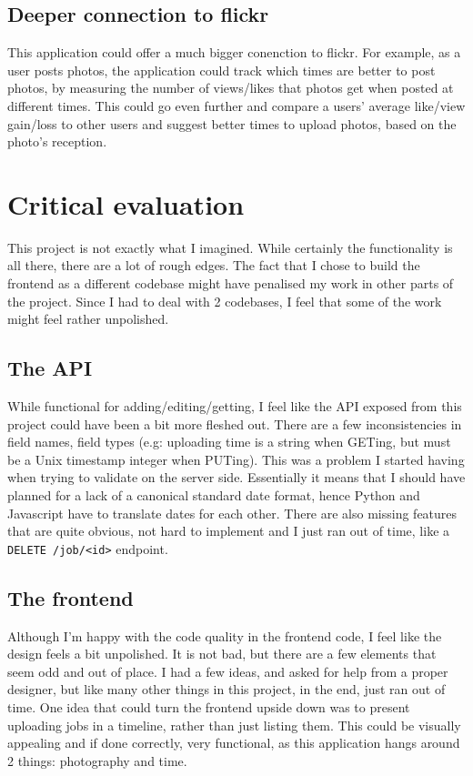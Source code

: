 \documentclass[10pt, a4paper]{article}
\begin{document}
        \subsection{Deeper connection to flickr}
        This application could offer a much bigger conenction to flickr. For example, as a user posts photos, the application could track which times are better to post photos, by measuring the number of views/likes that photos get when posted at different times. This could go even further and compare a users' average like/view gain/loss to other users and suggest better times to upload photos, based on the photo's reception.

        \section{Critical evaluation}
        This project is not exactly what I imagined. While certainly the functionality is all there, there are a lot of rough edges. The fact that I chose to build the frontend as a different codebase might have penalised my work in other parts of the project. Since I had to deal with 2 codebases, I feel that some of the work might feel rather unpolished.
        
        \subsection{The API}
        While functional for adding/editing/getting, I feel like the API exposed from this project could have been a bit more fleshed out. There are a few inconsistencies in field names, field types (e.g: uploading time is a string when GETing, but must be a Unix timestamp integer when PUTing). This was a problem I started having when trying to validate on the server side. Essentially it means that I should have planned for a lack of a canonical standard date format, hence Python and Javascript have to translate dates for each other.
        There are also missing features that are quite obvious, not hard to implement and I just ran out of time, like a \texttt{DELETE /job/<id>} endpoint.

        \subsection{The frontend}
        Although I'm happy with the code quality in the frontend code, I feel like the design feels a bit unpolished. It is not bad, but there are a few elements that seem odd and out of place. I had a few ideas, and asked for help from a proper designer, but like many other things in this project, in the end, just ran out of time. One idea that could turn the frontend upside down was to present uploading jobs in a timeline, rather than just listing them. This could be visually appealing and if done correctly, very functional, as this application hangs around 2 things: photography and time.
\end{document}
